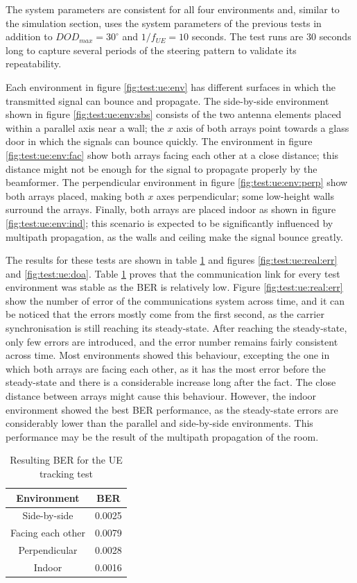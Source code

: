\documentclass[12pt,a4paper]{report}
\begin{document}
The system parameters are consistent for all four environments and, similar to the simulation section, uses the system parameters of the previous tests in addition to $DOD_{max} = 30^\circ$ and $1/f_{UE} = 10$ seconds. The test runs are 30 seconds long to capture several periods of the steering pattern to validate its repeatability. 

Each environment in figure \ref{fig:test:ue:env} has different surfaces in which the transmitted signal can bounce and propagate. The side-by-side environment shown in figure \ref{fig:test:ue:env:sbs} consists of the two antenna elements placed within a parallel axis near a wall; the $x$ axis of both arrays point towards a glass door in which the signals can bounce quickly. The environment in figure \ref{fig:test:ue:env:fac} show both arrays facing each other at a close distance; this distance might not be enough for the signal to propagate properly by the beamformer. The perpendicular environment in figure \ref{fig:test:ue:env:perp} show both arrays placed, making both $x$ axes perpendicular; some low-height walls surround the arrays. Finally, both arrays are placed indoor as shown in figure \ref{fig:test:ue:env:ind}; this scenario is expected to be significantly influenced by multipath propagation, as the walls and ceiling make the signal bounce greatly.

The results for these tests are shown in table \ref{tab:test:ue:real:ber} and figures \ref{fig:test:ue:real:err} and \ref{fig:test:ue:doa}. Table \ref{tab:test:ue:real:ber} proves that the communication link for every test environment was stable as the BER is relatively low. Figure \ref{fig:test:ue:real:err} show the number of error of the communications system across time, and it can be noticed that the errors mostly come from the first second, as the carrier synchronisation is still reaching its steady-state. After reaching the steady-state, only few errors are introduced, and the error number remains fairly consistent across time. Most environments showed this behaviour, excepting the one in which both arrays are facing each other, as it has the most error before the steady-state and there is a considerable increase long after the fact. The close distance between arrays might cause this behaviour. However, the indoor environment showed the best BER performance, as the steady-state errors are considerably lower than the parallel and side-by-side environments. This performance may be the result of the multipath propagation of the room.

\begin{table}[h]
    \centering
    \begin{tabular}{c|c}
        Environment & BER \\ \hline
        Side-by-side & 0.0025 \\
        Facing each other & 0.0079 \\
        Perpendicular & 0.0028 \\
        Indoor & 0.0016
    \end{tabular}
    \caption{Resulting BER for the UE tracking test}
    \label{tab:test:ue:real:ber}
\end{table}
\end{document}
